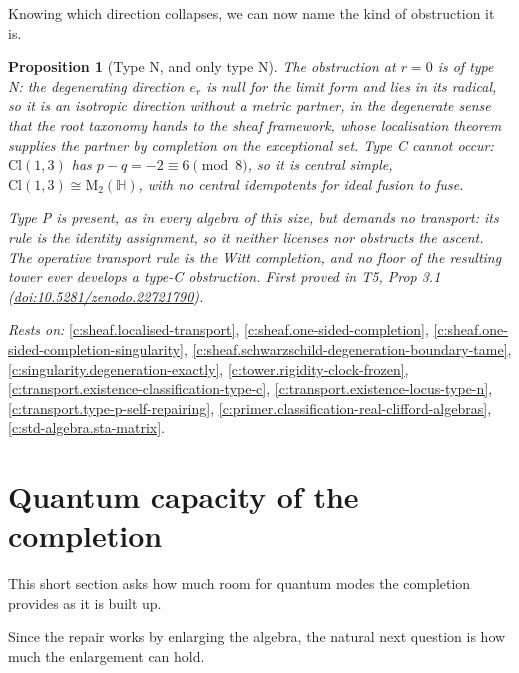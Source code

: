 \documentclass[11pt]{article}
\newtheorem{proposition}[theorem]{Proposition}
\theoremstyle{definition}
\theoremstyle{plain}
\providecommand{\Cl}{}\renewcommand{\Cl}{\mathrm{Cl}}
\providecommand{\HH}{}\renewcommand{\HH}{\mathbb{H}}
\providecommand{\Mat}{}\renewcommand{\Mat}{\mathrm{M}}
\providecommand{\er}{}\renewcommand{\er}{e_r}
\begin{document}
Knowing which direction collapses, we can now name the kind of obstruction it is.

\begin{proposition}[Type N, and only type N]\label{c:singularity.type-n-only-type-n}
The obstruction at $r = 0$ is of type N: the degenerating direction $\er$ is null for the limit form and lies in its radical, so it is an isotropic direction without a metric partner, in the degenerate sense that the root taxonomy hands to the sheaf framework, whose localisation theorem supplies the partner by completion on the exceptional set. Type C cannot occur: $\Cl(1,3)$ has $p - q = -2 \equiv 6 \pmod 8$, so it is central simple, $\Cl(1,3) \cong \Mat_2(\HH)$, with no central idempotents for ideal fusion to fuse.

Type P is present, as in every algebra of this size, but demands no transport: its rule is the identity assignment, so it neither licenses nor obstructs the ascent. The operative transport rule is the Witt completion, and no floor of the resulting tower ever develops a type-C obstruction.
\emph{First proved in} T5, Prop 3.1 (\href{https://doi.org/10.5281/zenodo.22721790}{doi:10.5281/zenodo.22721790}).
\end{proposition}
\noindent\emph{Rests on:} \ref{c:sheaf.localised-transport}, \ref{c:sheaf.one-sided-completion}, \ref{c:sheaf.one-sided-completion-singularity}, \ref{c:sheaf.schwarzschild-degeneration-boundary-tame}, \ref{c:singularity.degeneration-exactly}, \ref{c:tower.rigidity-clock-frozen}, \ref{c:transport.existence-classification-type-c}, \ref{c:transport.existence-locus-type-n}, \ref{c:transport.type-p-self-repairing}, \ref{c:primer.classification-real-clifford-algebras}, \ref{c:std-algebra.sta-matrix}.

\section{Quantum capacity of the completion}

This short section asks how much room for quantum modes the completion provides as it is built up.

Since the repair works by enlarging the algebra, the natural next question is how much the enlargement can hold.
\end{document}
